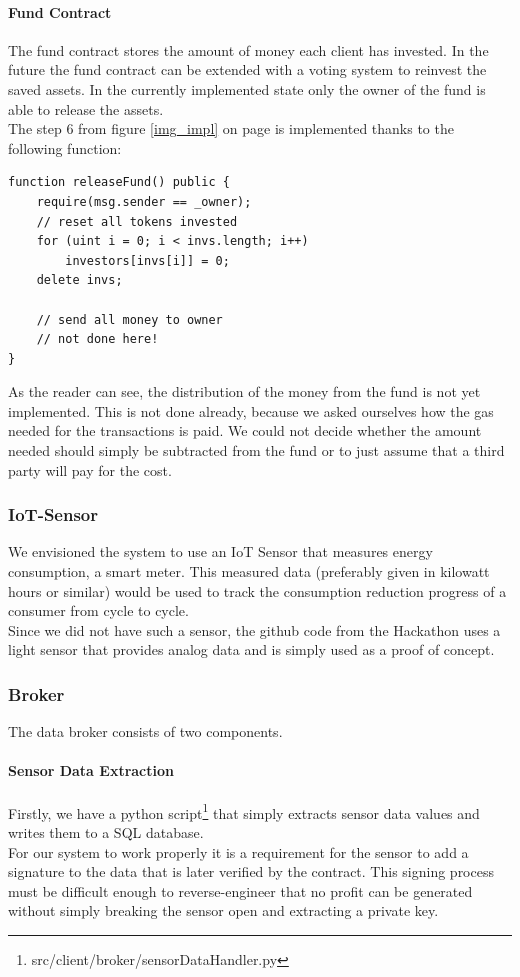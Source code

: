 \documentclass[11pt]{article}
\begin{document}
\paragraph{Fund Contract}
The fund contract stores the amount of money each client has invested. In the future the fund contract can be extended with a voting system to reinvest the saved assets. In the currently implemented state only the owner of the fund is able to release the assets.\\
The step 6 from figure \ref{img_impl} on page \pageref{img_impl} is implemented thanks to the following function:
\begin{lstlisting}[language=Solidity, firstnumber=17,caption={src/smartcontracts/contracts/Fund.sol},captionpos=b]
function releaseFund() public {
	require(msg.sender == _owner);
	// reset all tokens invested
	for (uint i = 0; i < invs.length; i++)
	    investors[invs[i]] = 0;
	delete invs;
	
	// send all money to owner
	// not done here!
}
\end{lstlisting}
As the reader can see, the distribution of the money from the fund is not yet implemented. This is not done already, because we asked ourselves how the gas needed for the transactions is paid. We could not decide whether the amount needed should simply be subtracted from the fund or to just assume that a third party will pay for the cost.
\subsubsection{IoT-Sensor}
We envisioned the system to use an IoT Sensor that measures energy consumption, a smart meter. This measured data (preferably given in kilowatt hours or similar) would be used to track the consumption reduction progress of a consumer from cycle to cycle. \\
Since we did not have such a sensor, the github code from the Hackathon uses a light sensor that provides analog data and is simply used as a proof of concept.

\subsubsection{Broker}
The data broker consists of two components.
\paragraph{Sensor Data Extraction}
Firstly, we have a python script\footnote{src/client/broker/sensorDataHandler.py} that simply extracts sensor data values and writes them to a SQL database. \\
For our system to work properly it is a requirement for the sensor to add a signature to the data that is later verified by the contract. This signing process must be difficult enough to reverse-engineer that no profit can be generated without simply breaking the sensor open and extracting a private key.
\end{document}
